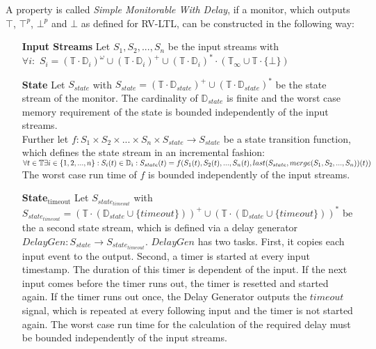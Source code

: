 	\begin{definition}
		A property is called \textit{Simple Monitorable With Delay}, if a monitor, which outputs $\top$, $\top^p$, $\bot^p$ and $\bot$ as defined for RV-LTL, can be constructed in the following way:
		\begin{itemize}
			\item[\textbf{Input Streams}]
				Let $S_1, S_2, ..., S_n$ be the input streams with\\
				$\forall i:$ $S_i=(\mathbb{T}\cdot \mathbb{D}_i)^\omega\cup(\mathbb{T}\cdot \mathbb{D}_i)^+\cup(\mathbb{T}\cdot \mathbb{D}_i)^*\cdot(\mathbb{T}_\infty\cup\mathbb{T}\cdot\{\bot\})$
			\item[\textbf{State}]
				Let $S_{state}$ with $S_{state}= (\mathbb{T}\cdot \mathbb{D}_{state})^+\cup(\mathbb{T}\cdot \mathbb{D}_{state})^*$ be the state stream of the monitor. The cardinality of $\mathbb{D}_{state}$ is finite and the worst case memory requirement of the state is bounded independently of the input streams.\\
				Further let $f: S_1 \times S_2 \times ... \times S_n \times S_{state}\rightarrow S_{state}$ be a state transition function, which defines the state stream in an incremental fashion:
				\begin{math}
					\forall t\in \mathbb T \exists i\in \{1,2,...,n\}: S_i(t)\in\mathbb D_i:\\
					S_{state}(t)= f(S_1(t), S_2(t), ..., S_n(t), last(S_{state}, merge(S_1, S_2, ..., S_n))(t))
				\end{math}\\
				The worst case run time of $f$ is bounded independently of the input streams.
			\item[\textbf{State$_\text{timeout}$}]
				Let $S_{state_{timeout}}$ with $S_{state_{timeout}}= (\mathbb{T}\cdot (\mathbb{D}_{state}\cup \{timeout\}))^+\cup(\mathbb{T}\cdot (\mathbb{D}_{state}\cup \{timeout\}))^*$ be the a second state stream, which is defined via a delay generator $DelayGen: S_{state}\rightarrow S_{state_{timeout}}$. $DelayGen$ has two tasks. First, it copies each input event to the output. Second, a timer is started at every input timestamp. The duration of this timer is dependent of the input. If the next input comes before the timer runs out, the timer is resetted and started again. If the timer runs out once, the Delay Generator outputs the $timeout$ signal, which is repeated at every following input and the timer is not started again. The worst case run time for the calculation of the required delay must be bounded independently of the input streams.

\end{itemize}
\end{definition}
